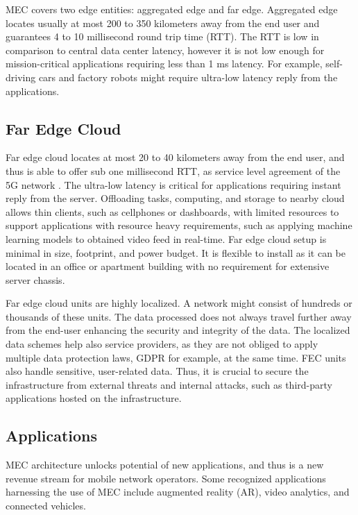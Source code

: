 MEC covers two edge entities: aggregated edge and far edge. Aggregated edge locates usually at most 200 to 350 kilometers away from the end user and guarantees 4 to 10 millisecond round trip time (RTT). The RTT is low in comparison to central data center latency, however it is not low enough for mission-critical applications requiring less than 1 ms latency. For example, self-driving cars and factory robots might require ultra-low latency reply from the applications.

\subsection{Far Edge Cloud}

Far edge cloud locates at most 20 to 40 kilometers away from the end user, and thus is able to offer sub one millisecond RTT, as service level agreement of the 5G network \cite{Parvez2018}. The ultra-low latency is critical for applications requiring instant reply from the server. Offloading tasks, computing, and storage to nearby cloud allows thin clients, such as cellphones or dashboards, with limited resources to support applications with resource heavy requirements, such as applying machine learning models to obtained video feed in real-time. Far edge cloud setup is minimal in size, footprint, and power budget. It is flexible to install as it can be located in an office or apartment building with no requirement for extensive server chassis. \cite{AirFrameOpenEdgeServer}

Far edge cloud units are highly localized. A network might consist of hundreds or thousands of these units. The data processed does not always travel further away from the end-user enhancing the security and integrity of the data. The localized data schemes help also service providers, as they are not obliged to apply multiple data protection laws, GDPR for example, at the same time. FEC units also handle sensitive, user-related data. Thus, it is crucial to secure the infrastructure from external threats and internal attacks, such as third-party applications hosted on the infrastructure.

\subsection{Applications}
\label{subs:applications}

MEC architecture unlocks potential of new applications, and thus is a new revenue stream for mobile network operators. Some recognized applications harnessing the use of MEC include augmented reality (AR), video analytics, and connected vehicles.

